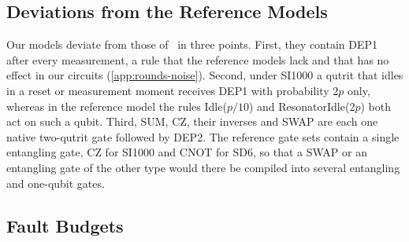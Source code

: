\subsection{Deviations from the Reference Models}
\label{app:rounds-deviations}

Our models deviate from those of~\cite{GidneyHoneycomb2021} in three points. First, they contain DEP1 after every measurement, a rule that the reference models lack and that has no effect in our circuits (\autoref{app:rounds-noise}). Second, under SI1000 a qutrit that idles in a reset or measurement moment receives DEP1 with probability $2p$ only, whereas in the reference model the rules Idle($p/10$) and ResonatorIdle($2p$) both act on such a qubit. Third, SUM, CZ, their inverses and SWAP are each one native two-qutrit gate followed by DEP2. The reference gate sets contain a single entangling gate, CZ for SI1000 and CNOT for SD6, so that a SWAP or an entangling gate of the other type would there be compiled into several entangling and one-qubit gates.

\subsection{Fault Budgets}
\label{app:rounds-budget}

